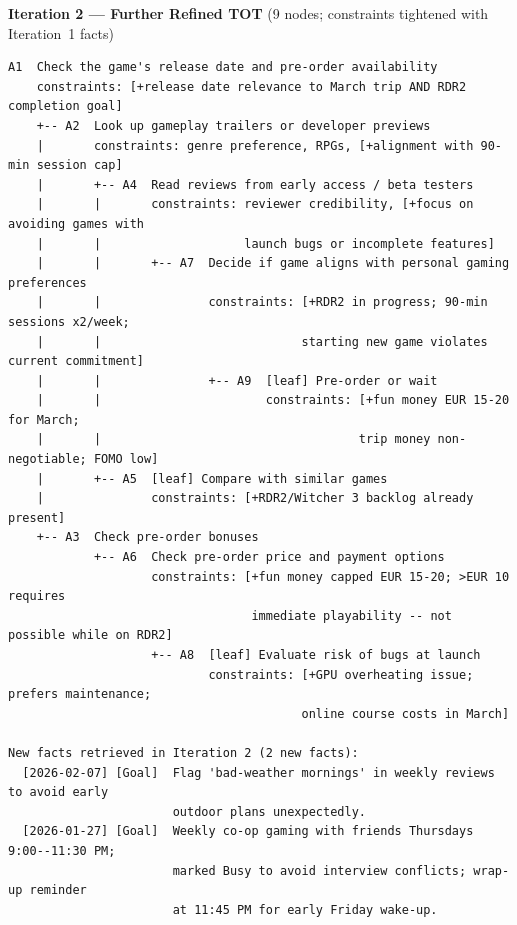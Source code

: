 \vspace{0.5em}
\noindent\textbf{Iteration 2 --- Further Refined TOT} {\small(9 nodes; constraints tightened with Iteration~1 facts)}
\begin{lstlisting}[style=appendixbox]
A1  Check the game's release date and pre-order availability
    constraints: [+release date relevance to March trip AND RDR2 completion goal]
    +-- A2  Look up gameplay trailers or developer previews
    |       constraints: genre preference, RPGs, [+alignment with 90-min session cap]
    |       +-- A4  Read reviews from early access / beta testers
    |       |       constraints: reviewer credibility, [+focus on avoiding games with
    |       |                    launch bugs or incomplete features]
    |       |       +-- A7  Decide if game aligns with personal gaming preferences
    |       |               constraints: [+RDR2 in progress; 90-min sessions x2/week;
    |       |                            starting new game violates current commitment]
    |       |               +-- A9  [leaf] Pre-order or wait
    |       |                       constraints: [+fun money EUR 15-20 for March;
    |       |                                    trip money non-negotiable; FOMO low]
    |       +-- A5  [leaf] Compare with similar games
    |               constraints: [+RDR2/Witcher 3 backlog already present]
    +-- A3  Check pre-order bonuses
            +-- A6  Check pre-order price and payment options
                    constraints: [+fun money capped EUR 15-20; >EUR 10 requires
                                  immediate playability -- not possible while on RDR2]
                    +-- A8  [leaf] Evaluate risk of bugs at launch
                            constraints: [+GPU overheating issue; prefers maintenance;
                                         online course costs in March]

New facts retrieved in Iteration 2 (2 new facts):
  [2026-02-07] [Goal]  Flag 'bad-weather mornings' in weekly reviews to avoid early
                       outdoor plans unexpectedly.
  [2026-01-27] [Goal]  Weekly co-op gaming with friends Thursdays 9:00--11:30 PM;
                       marked Busy to avoid interview conflicts; wrap-up reminder
                       at 11:45 PM for early Friday wake-up.
\end{lstlisting}

